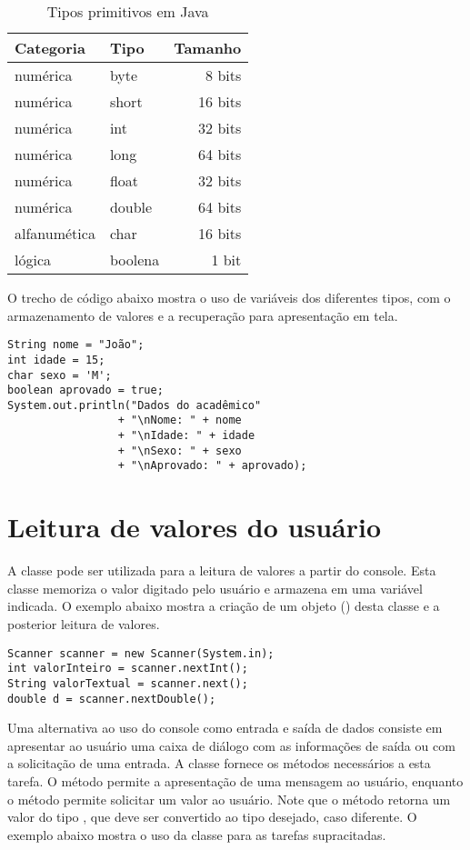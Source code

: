 \begin{table}[ht]
	\centering
	\begin{tabular}{llr}
		\hline
		\textbf{Categoria}    & \textbf{Tipo}    & \textbf{Tamanho} \\ \hline
		numérica     & byte   & 8 bits \\
		numérica     & short   & 16 bits \\
		numérica     & int     & 32 bits \\
		numérica     & long    & 64 bits \\
		numérica     & float   & 32 bits \\
		numérica     & double  & 64 bits \\
		alfanumética & char    & 16 bits \\
		lógica       & boolena & 1 bit \\\hline
	\end{tabular}
	\caption{Tipos primitivos em Java}
	\label{tab:tipos-primitivos}
\end{table}

O trecho de código abaixo mostra o uso de variáveis dos diferentes tipos, com o armazenamento de valores e a recuperação para apresentação em tela.

\begin{verbatim}
String nome = "João";
int idade = 15;
char sexo = 'M';
boolean aprovado = true;
System.out.println("Dados do acadêmico"
                 + "\nNome: " + nome
                 + "\nIdade: " + idade
                 + "\nSexo: " + sexo
                 + "\nAprovado: " + aprovado);
\end{verbatim}

\section{Leitura de valores do usuário}

A classe  pode ser utilizada para a leitura de valores a partir do console. Esta classe memoriza o valor digitado pelo usuário e armazena em uma variável indicada. O exemplo abaixo mostra a criação de um objeto () desta classe e a posterior leitura de valores.


\begin{verbatim}
Scanner scanner = new Scanner(System.in);
int valorInteiro = scanner.nextInt();
String valorTextual = scanner.next();
double d = scanner.nextDouble();
\end{verbatim}

Uma alternativa ao uso do console como entrada e saída de dados consiste em apresentar ao usuário uma caixa de diálogo com as informações de saída ou com a solicitação de uma entrada. A classe  fornece os métodos necessários a esta tarefa. O método  permite a apresentação de uma mensagem ao usuário, enquanto o método  permite solicitar um valor ao usuário. Note que o método retorna um valor do tipo , que deve ser convertido ao tipo desejado, caso diferente. O exemplo abaixo mostra o uso da classe  para as tarefas supracitadas.

